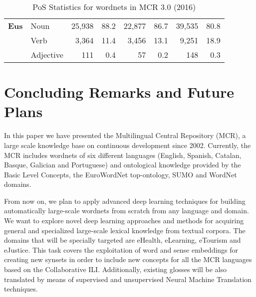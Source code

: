\documentclass[runningheads]{llncs}
\begin{document}
\begin{table*}[!h]
\begin{tabular}{llrrrrrr}
    {\bf Eus}   & 
        Noun &
    25,938 & 
    88.2 & 
    22,877 &
    86.7 &
    39,535 &
    80.8 \\
    & 
    Verb &
    3,364 & 
    11.4 & 
    3,456 &
    13.1 &
    9,251 &
    18.9 \\
    & 
    Adjective &
    111 & 
    0.4 & 
    57 &
    0.2 &
    148 &
    0.3 \\
          \hline 
          \end{tabular}
          \caption{PoS Statistics for wordnets in  MCR 3.0 (2016)}
  \label{tab:mcr_all-3.0-2016:stats:pos} 
   \end{table*} 





\section{Concluding Remarks and Future Plans}



In this paper we have presented the Multilingual Central Repository (MCR), a large scale knowledge base on continuous development since 2002. Currently, the  MCR includes wordnets of six different languages (English, Spanish, Catalan, Basque, Galician and Portuguese) and ontological knowledge provided by the Basic Level Concepts, the EuroWordNet top-ontology,  SUMO and WordNet domains.

From now on, we plan  to apply advanced deep learning techniques for building automatically large-scale wordnets from scratch from any language and domain. We want to explore novel deep learning approaches and methods for acquiring general and specialized large-scale lexical knowledge from textual corpora. The domains that will be specially targeted are eHealth, eLearning, eTourism and eJustice.  This task covers the exploitation of word and sense embeddings for creating new synsets in order to include new concepts for all the MCR languages based on the Collaborative ILI. Additionally, existing glosses will be also translated by means of supervised and unsupervised Neural Machine Translation techniques.
\end{document}
